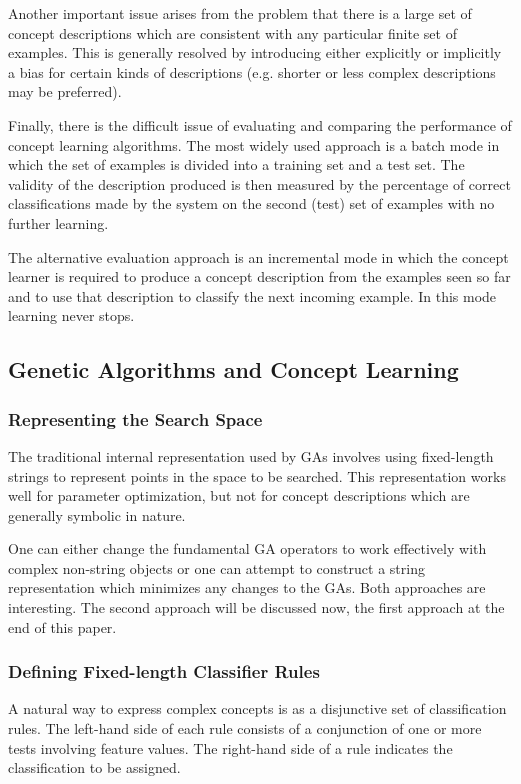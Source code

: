 \documentclass[12pt]{article}
\begin{document}
Another important issue arises from the problem that there is a large set of concept descriptions which are consistent with any particular finite set of examples. This is generally resolved  by introducing either explicitly or implicitly a bias for certain kinds of descriptions (e.g. shorter or less complex descriptions may be preferred).

Finally, there is the difficult issue of evaluating and comparing the performance of concept learning algorithms. The most widely used approach is a batch mode in which the set of examples is divided into a training set and a test set. The validity of the description produced is then measured by the percentage of correct classifications made by the system on the second (test) set of examples with no further learning.

The alternative evaluation approach is an incremental mode in which the concept learner is required to produce a concept description from the examples seen so far and to use that description to classify the next incoming example. In this mode learning never stops.

\subsection{Genetic Algorithms and Concept Learning}

\subsubsection{Representing the Search Space}
The traditional internal representation used by GAs involves using fixed-length strings to represent points in the space to be searched. This representation works well for parameter optimization, but not for concept descriptions which are generally symbolic in nature.

One can either change the fundamental GA operators to work effectively with complex non-string objects or one can attempt to construct a string representation which minimizes any changes to the GAs. Both approaches are interesting. The second approach will be discussed now, the first approach at the end of this paper.

\subsubsection{Defining Fixed-length Classifier Rules}
A natural way to express complex concepts is as a disjunctive set of classification rules. The left-hand side of each rule consists of a conjunction of one or more tests involving feature values. The right-hand side of a rule indicates the classification to be assigned.
\end{document}
